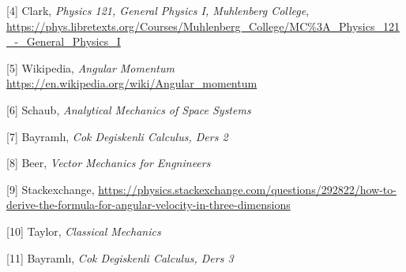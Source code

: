 \documentclass[12pt,fleqn]{article}\usepackage{../../common}
\begin{document}
[4] Clark, {\em Physics 121, General Physics I, Muhlenberg College},
    \url{https://phys.libretexts.org/Courses/Muhlenberg_College/MC%3A_Physics_121_-_General_Physics_I}

[5] Wikipedia, {\em Angular Momentum}
    \url{https://en.wikipedia.org/wiki/Angular_momentum}

[6] Schaub, {\em Analytical Mechanics of Space Systems}

[7] Bayramlı, {\em Cok Degiskenli Calculus, Ders 2}

[8] Beer, {\em Vector Mechanics for Engnineers}

[9] Stackexchange, \url{https://physics.stackexchange.com/questions/292822/how-to-derive-the-formula-for-angular-velocity-in-three-dimensions}

[10] Taylor, {\em Classical Mechanics}

[11] Bayramlı, {\em Cok Degiskenli Calculus, Ders 3}
\end{document}
